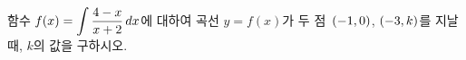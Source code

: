 함수 $f(x)=\displaystyle\int\dfrac{4-x}{x+2}\mkern3mu dx$에 대하여 곡선 $y=f(x)$가 두 점~$(-1{,}\mkern3mu\mathopen{}0)$, $(-3{,}\mkern3mu\mathopen{}k)$를 지날 때, $k$의 값을 구하시오.
